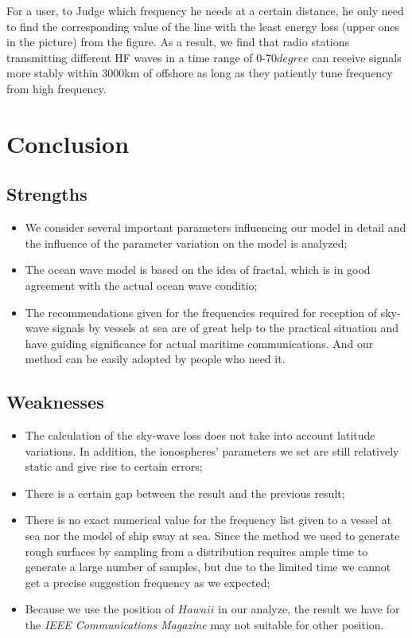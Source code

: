 \documentclass{mcmthesis}
\begin{document}
      For a user, to Judge which frequency he needs at a certain distance, he only need to find the corresponding value of the line with the least energy loss (upper ones in the picture) from the figure. As a result, we find that radio stations transmitting different HF waves in a time range of 0-70$degree$ can receive signals more stably within 3000km of offshore as long as they patiently tune frequency from high frequency.

\section{Conclusion}
  \subsection{Strengths}
  \begin{itemize}
    \item We consider several important parameters influencing our model in detail and the influence of the parameter variation on the model is analyzed;\\
    \item The ocean wave model is based on the idea of fractal, which is in good agreement with the actual ocean wave conditio;\\
    \item The recommendations given for the frequencies required for reception of sky-wave signals by vessels at sea are of great help to the practical situation and have guiding significance for actual maritime communications. And our method can be easily adopted by people who need it.
  \end{itemize}

  \subsection{Weaknesses}
    \begin{itemize}
      \item The calculation of the sky-wave loss does not take into account latitude variations. In addition, the ionospheres' parameters we set are still relatively static and give rise to certain errors;\\
      \item There is a certain gap between the result and the previous result;\\
      \item There is no exact numerical value for the frequency list given to a vessel at sea nor the model of ship sway at sea. Since the method we used to generate rough surfaces by sampling from a distribution requires ample time to generate a large number of samples, but due to the limited time we cannot get a precise suggestion frequency as we expected;\\
      \item Because we use the position of $Hawaii$ in our analyze, the result we have for the \emph{IEEE Communications Magazine} may not suitable for other position.
    \end{itemize}
\end{document}
